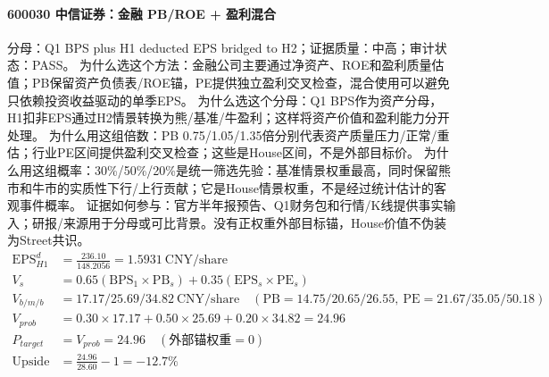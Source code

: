 \paragraph{600030 中信证券：金融 PB/ROE + 盈利混合}
分母：Q1 BPS plus H1 deducted EPS bridged to H2；证据质量：中高；审计状态：PASS。
为什么选这个方法：金融公司主要通过净资产、ROE和盈利质量估值；PB保留资产负债表/ROE锚，PE提供独立盈利交叉检查，混合使用可以避免只依赖投资收益驱动的单季EPS。
为什么选这个分母：Q1 BPS作为资产分母，H1扣非EPS通过H2情景转换为熊/基准/牛盈利；这样将资产价值和盈利能力分开处理。
为什么用这组倍数：PB 0.75/1.05/1.35倍分别代表资产质量压力/正常/重估；行业PE区间提供盈利交叉检查；这些是House区间，不是外部目标价。
为什么用这组概率：30\%/50\%/20\%是统一筛选先验：基准情景权重最高，同时保留熊市和牛市的实质性下行/上行贡献；它是House情景权重，不是经过统计估计的客观事件概率。
证据如何参与：官方半年报预告、Q1财务包和行情/K线提供事实输入；研报/来源用于分母或可比背景。没有正权重外部目标锚，House价值不伪装为Street共识。
\begin{align*}
\mathrm{EPS}_{H1}^d &= \frac{236.10}{148.2056} = 1.5931\ \mathrm{CNY/share}\\
V_s &= 0.65\left(\mathrm{BPS}_1\times \mathrm{PB}_s\right)+0.35\left(\mathrm{EPS}_s\times \mathrm{PE}_s\right)\\
V_{b/m/b} &= 17.17/25.69/34.82\ \mathrm{CNY/share}\quad(\mathrm{PB}=14.75/20.65/26.55,\ \mathrm{PE}=21.67/35.05/50.18)\\
V_{prob} &= 0.30\times 17.17+0.50\times 25.69+0.20\times 34.82=24.96\\
P_{target} &= V_{prob}=24.96\quad(\text{外部锚权重}=0)\\
\mathrm{Upside} &= \frac{24.96}{28.60}-1=-12.7\%\\
\end{align*}


